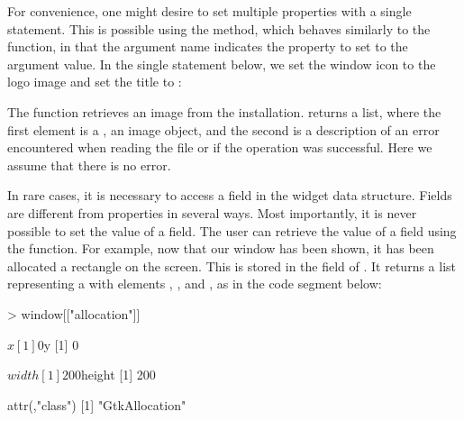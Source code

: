 \documentclass[article,shortnames]{jss}
\begin{document}
For convenience, one might desire to set multiple properties with a
single statement.
This is possible using the  method, which behaves
similarly
to the   function, in that the argument name
indicates
the property to set to the argument value. 
In the single statement below, we 
set the window icon to the  logo image and set the title to
:
The  function retrieves an image from the 
installation.
 returns a list, where the first element is a
, an image object,
and the second is a description of an error encountered when reading
the file
or  if the operation was successful. Here we assume that
there is no error.

In rare cases, it is necessary to access a field in the widget data
structure.
Fields are different from properties in several ways. Most
importantly, it is
never possible to set the value of a field. The user can retrieve the
value of
a field using the \code{[[} function. For example, now that our window
has been shown, it has been allocated a rectangle on the screen. This
is stored
in the  field of . It returns a list 
representing a  with elements , ,
 and , as in the code segment below:

\begin{CodeChunk}
\begin{CodeInput}
> window[["allocation"]]
\end{CodeInput}
\begin{CodeOutput}
$x
[1] 0

$y
[1] 0

$width
[1] 200

$height
[1] 200

attr(,"class")
[1] "GtkAllocation"
\end{CodeOutput}
\end{CodeChunk}
\end{document}
